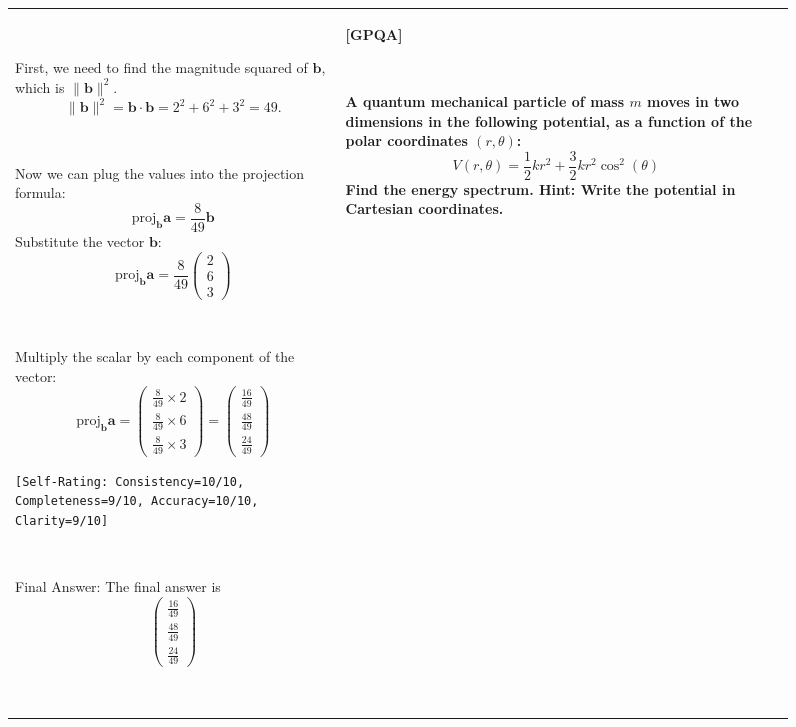 \documentclass{article}
\theoremstyle{plain}
\theoremstyle{definition}
\theoremstyle{remark}
\begin{document}
\begin{figure}[p]
\begin{tabular}{@{}p{}p{}p{}@{}}
~

\textcolor{defaultlightblue}{
First, we need to find the magnitude squared of $\mathbf{b}$, which is $\|\mathbf{b}\|^2$.
{\small $$\|\mathbf{b}\|^2 = \mathbf{b} \cdot \mathbf{b} = 2^2 + 6^2 + 3^2 = 49.$$}
}



~

\textcolor{defaultlightblue}{
Now we can plug the values into the projection formula:
$$\text{proj}_{\mathbf{b}} \mathbf{a} = \frac{8}{49} \mathbf{b}$$
Substitute the vector $\mathbf{b}$:
$$\text{proj}_{\mathbf{b}} \mathbf{a} = \frac{8}{49} \begin{pmatrix} 2 \\ 6 \\ 3 \end{pmatrix}$$}


~

\textcolor{defaultlightblue}{
Multiply the scalar by each component of the vector:
$$\text{proj}_{\mathbf{b}} \mathbf{a} = \begin{pmatrix} \frac{8}{49} \times 2 \\ \frac{8}{49} \times 6 \\ \frac{8}{49} \times 3 \end{pmatrix} = \begin{pmatrix} \frac{16}{49} \\ \frac{48}{49} \\ \frac{24}{49} \end{pmatrix}$$
}

\texttt{\small [Self-Rating: Consistency=10/10, Completeness=9/10, Accuracy=10/10, Clarity=9/10]}

~

\textcolor{defaultblue}{
Final Answer: The final answer is 
$$\boxed{\begin{pmatrix} \frac{16}{49} \\ \frac{48}{49} \\ \frac{24}{49} \end{pmatrix}}$$
}


~


&
\textbf{[GPQA]}

~

\textbf{
A quantum mechanical particle of mass $m$ moves in two dimensions in the following potential, as a function of the polar coordinates $(r, \theta)$:
$$V(r, \theta) = \frac{1}{2} k r^2 + \frac{3}{2} k r^2 \cos^2(\theta)$$
Find the energy spectrum.
\textbf{Hint:} Write the potential in Cartesian coordinates.
}


\end{tabular}
\end{figure}
\end{document}
